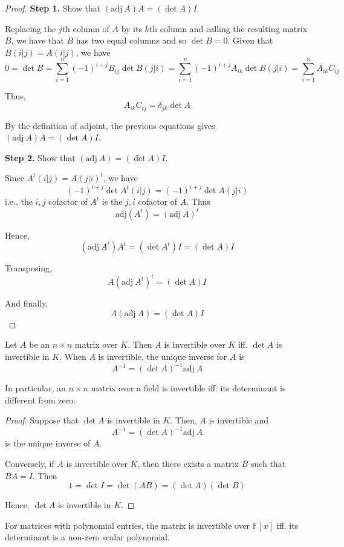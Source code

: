 \begin{proof}

	\textbf{Step 1.} Show that $(\text{adj} ~A)A = (\det A)I$.
	
	Replacing the $j$th column of $A$ by its $k$th column and calling the resulting matrix $B$, we have that $B$ has two equal columns and so $\det B = 0$. Given that $B(i|j) = A(i|j)$, we have
	\[
		0 = \det B = \sum_{i=1}^n (-1)^{i+j} B_{ij} \det B(j|i) = \sum_{i=1}^n (-1)^{i+j} A_{ik} \det B(j|i) = \sum_{i=1}^n A_{ik} C_{ij}
	\]
	
	Thus,
	\[
		A_{ik} C_{ij} = \delta_{jk} \det A
	\]
	
	By the definition of adjoint, the previous equations gives $(\text{adj} ~A)A = (\det A)I$.
	
	\textbf{Step 2.} Show that $(\text{adj} ~A) = (\det A)I$.

	Since $A^t(i|j) = A(j|i)^t$, we have
	\[
		(-1)^{i+j} \det A^t(i|j) = (-1)^{i+j} \det A(j|i)
	\]
	i.e., the $i,j$ cofactor of $A^t$ is the $j, i$ cofactor of $A$. Thus
	\[
		\text{adj}(A^t) = (\text{adj}~A)^t
	\]
	
	Hence,
	\[
		(\text{adj}~A^t)A^t = (\det A^t) I = (\det A)I 
	\]
	
	Transposing,
	\[
		A(\text{adj}~A^t)^t = (\det A)I 
	\]
	
	And finally,
	\[
		A(\text{adj}~A) = (\det A)I
	\]
\end{proof}

\begin{theorem}
	Let $A$ be an $n \times n$ matrix over $K$. Then $A$ is invertible over $K$ iff. $\det A$ is invertible in $K$. When $A$ is invertible, the unique inverse for $A$ is
	\[
		A^{-1} = (\det A)^{-1} \text{adj}~A
	\]
	
	In particular, an $n \times n$ matrix over a field is invertible iff. its determinant is different from zero.
\end{theorem}

\begin{proof}
	Suppose that $\det A$ is invertible in $K$. Then, $A$ is invertible and
	\[
		A^{-1} = (\det A)^{-1} \text{adj}~A
	\]
	is the unique inverse of $A$.
	
	Conversely, if $A$ is invertible over $K$, then there exists a matrix $B$ such that $BA = I$. Then
	\[
		1 = \det I = \det (AB) = (\det A)(\det B)
	\]
	
	Hence, $\det A$ is invertible in $K$.
\end{proof}

\begin{remark}
	For matrices with polynomial entries, the matrix is invertible over $\mathbb{F}[x]$ iff. its determinant is a non-zero scalar polynomial.
\end{remark}

